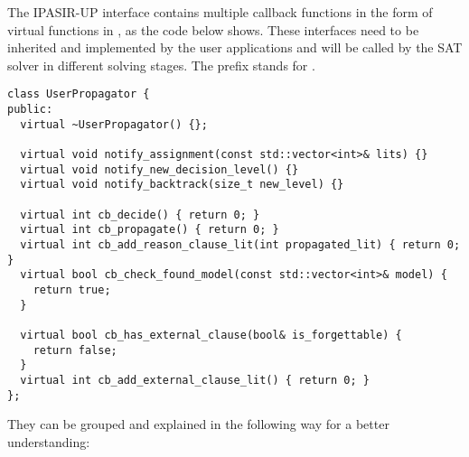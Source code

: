 The IPASIR-UP interface contains multiple callback functions in the form of virtual functions in , as the code below shows. These interfaces need to be inherited and implemented by the user applications and will be called by the SAT solver in different solving stages. The  prefix stands for .

\begin{lstlisting}
class UserPropagator {
public:
  virtual ~UserPropagator() {};

  virtual void notify_assignment(const std::vector<int>& lits) {}
  virtual void notify_new_decision_level() {}
  virtual void notify_backtrack(size_t new_level) {}

  virtual int cb_decide() { return 0; }
  virtual int cb_propagate() { return 0; }
  virtual int cb_add_reason_clause_lit(int propagated_lit) { return 0; }
  virtual bool cb_check_found_model(const std::vector<int>& model) {
    return true;
  }

  virtual bool cb_has_external_clause(bool& is_forgettable) {
    return false;
  }
  virtual int cb_add_external_clause_lit() { return 0; }
};
\end{lstlisting}

They can be grouped and explained in the following way for a better understanding:

